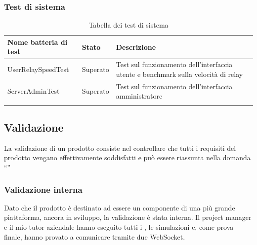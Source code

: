 		\subsubsection{Test di sistema}
		\begin{longtable}{ p{} p{} p{} }
				\toprule
				\textbf{Nome batteria di test} & \textbf{Stato} & \textbf{Descrizione} \\
				\midrule
				UserRelaySpeedTest 	& Superato  & Test sul funzionamento dell'interfaccia utente e benchmark sulla velocità di relay \\ 
				ServerAdminTest 		& Superato 	& Test sul funzionamento dell'interfaccia amministratore \\
			\caption{Tabella dei test di sistema}	
		\end{longtable}

	\subsection{Validazione}
	La validazione di un prodotto consiste nel controllare che tutti i requisiti del prodotto vengano effettivamente soddisfatti e può essere riassunta nella domanda ``''
		\subsubsection{Validazione interna}
		Dato che il prodotto è destinato ad essere un componente di una più grande piattaforma, ancora in sviluppo, la validazione è stata interna. Il project manager e il mio tutor aziendale hanno eseguito tutti i , le simulazioni e, come prova finale, hanno provato a comunicare tramite due  WebSocket.
